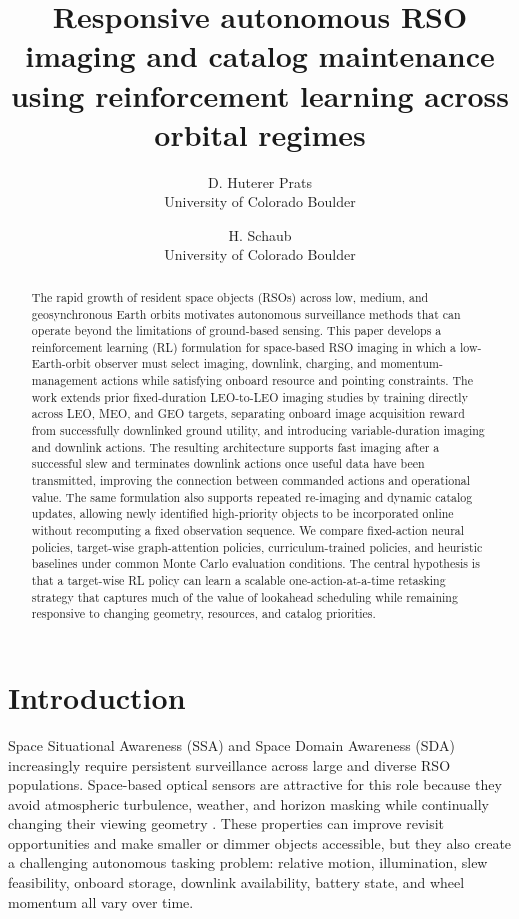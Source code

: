 \documentclass{amos}
\title{\TitleFont Responsive autonomous RSO imaging and catalog maintenance using reinforcement learning across orbital regimes}
\author{D. Huterer Prats \\ University of Colorado Boulder \and H. Schaub \\ University of Colorado Boulder}
\date{}
\begin{document}
\maketitle

\begin{abstract}
\normalsize
The rapid growth of resident space objects (RSOs) across low, medium, and geosynchronous Earth orbits motivates autonomous surveillance methods that can operate beyond the limitations of ground-based sensing. This paper develops a reinforcement learning (RL) formulation for space-based RSO imaging in which a low-Earth-orbit observer must select imaging, downlink, charging, and momentum-management actions while satisfying onboard resource and pointing constraints. The work extends prior fixed-duration LEO-to-LEO imaging studies by training directly across LEO, MEO, and GEO targets, separating onboard image acquisition reward from successfully downlinked ground utility, and introducing variable-duration imaging and downlink actions. The resulting architecture supports fast imaging after a successful slew and terminates downlink actions once useful data have been transmitted, improving the connection between commanded actions and operational value. The same formulation also supports repeated re-imaging and dynamic catalog updates, allowing newly identified high-priority objects to be incorporated online without recomputing a fixed observation sequence. We compare fixed-action neural policies, target-wise graph-attention policies, curriculum-trained policies, and heuristic baselines under common Monte Carlo evaluation conditions. The central hypothesis is that a target-wise RL policy can learn a scalable one-action-at-a-time retasking strategy that captures much of the value of lookahead scheduling while remaining responsive to changing geometry, resources, and catalog priorities.
\end{abstract}

\section{Introduction}

Space Situational Awareness (SSA) and Space Domain Awareness (SDA) increasingly require persistent surveillance across large and diverse RSO populations. Space-based optical sensors are attractive for this role because they avoid atmospheric turbulence, weather, and horizon masking while continually changing their viewing geometry \cite{ackermann2015spaceBased,lal2018global}. These properties can improve revisit opportunities and make smaller or dimmer objects accessible, but they also create a challenging autonomous tasking problem: relative motion, illumination, slew feasibility, onboard storage, downlink availability, battery state, and wheel momentum all vary over time.
\end{document}
